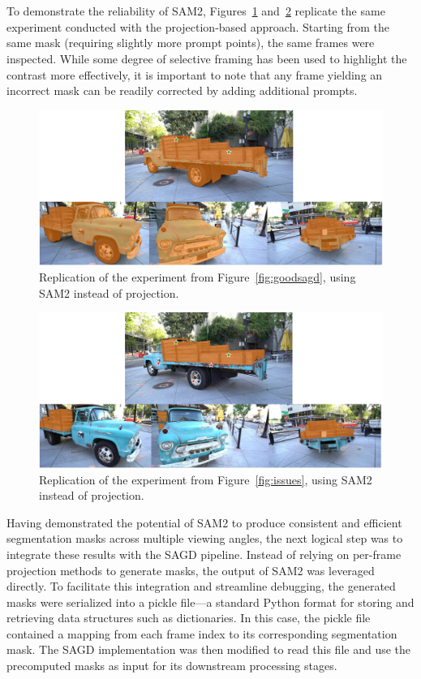 \documentclass[12pt]{article}
\begin{document}
\\\\
To demonstrate the reliability of SAM2, Figures~\ref{fig:sam2whole} and~\ref{fig:sam2wood} replicate the same experiment conducted with the projection-based approach. Starting from the same mask (requiring slightly more prompt points), the same frames were inspected. While some degree of selective framing has been used to highlight the contrast more effectively, it is important to note that any frame yielding an incorrect mask can be readily corrected by adding additional prompts.
\begin{figure}[h!]
	\centering
	\includegraphics[width=\textwidth]{Images/sam2whole.png}
	\caption{Replication of the experiment from Figure~\ref{fig:goodsagd}, using SAM2 instead of projection.}
	\label{fig:sam2whole}
\end{figure}
\begin{figure}[h!]
	\centering
	\includegraphics[width=\textwidth]{Images/sam2wood.png}
	\caption{Replication of the experiment from Figure~\ref{fig:issues}, using SAM2 instead of projection.}
	\label{fig:sam2wood}
\end{figure}
\FloatBarrier
\noindent
Having demonstrated the potential of SAM2 to produce consistent and efficient segmentation masks across multiple viewing angles, the next logical step was to integrate these results with the SAGD pipeline. Instead of relying on per-frame projection methods to generate masks, the output of SAM2 was leveraged directly. To facilitate this integration and streamline debugging, the generated masks were serialized into a pickle file—a standard Python format for storing and retrieving data structures such as dictionaries. In this case, the pickle file contained a mapping from each frame index to its corresponding segmentation mask. The SAGD implementation was then modified to read this file and use the precomputed masks as input for its downstream processing stages.\\\\
\end{document}
